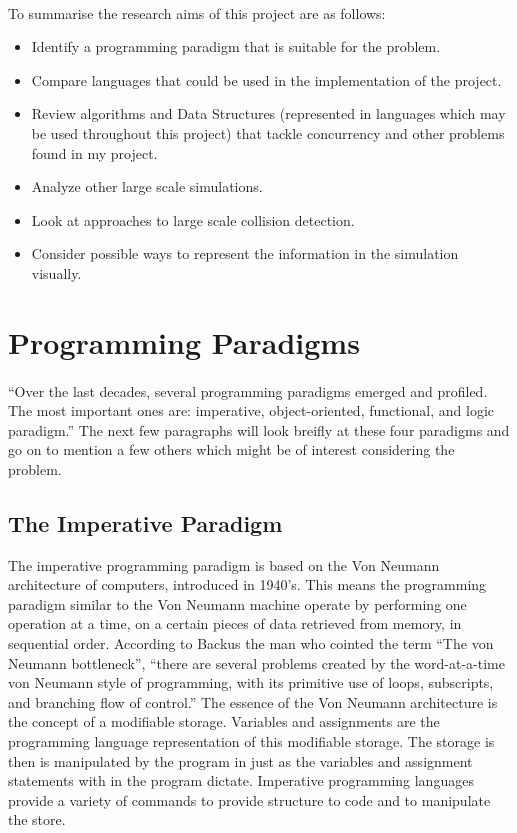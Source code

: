 \documentclass[main.tex]{subfiles}
\begin{document}
\paragraph{}To summarise the research aims of this project are as follows:
\begin{itemize}
	\item Identify a programming paradigm that is suitable for the problem.
	\item Compare languages that could be used in the implementation of the project.
	\item Review algorithms and Data Structures (represented in languages which may be used throughout this project) that tackle concurrency and other problems found in my project.
	\item Analyze other large scale simulations.
	\item Look at approaches to large scale collision detection.
	\item Consider possible ways to represent the information in the simulation visually.
\end{itemize}



\section{Programming Paradigms}
\paragraph{}``Over the last decades, several programming paradigms emerged and profiled. The most important ones are: imperative, object-oriented, functional, and logic paradigm.''\cite{Vujosevic2008} The next few paragraphs will look breifly at these four paradigms and go on to mention a few others which might be of interest considering the problem.

\subsection{The Imperative Paradigm}
The imperative programming paradigm is based on the Von Neumann architecture of computers, introduced in 1940’s. \cite{Vujosevic2008} This means the programming paradigm similar to the Von Neumann machine operate by performing one operation at a time, on a certain pieces of data retrieved from memory, in sequential order. According to Backus \cite{Backus1978} the man who cointed the term ``The von Neumann bottleneck'', ``there are several problems created by the word-at-a-time von Neumann style of programming, with its primitive use of loops, subscripts, and branching flow of control.'' The essence of the Von Neumann architecture is the concept of a modifiable storage. Variables and assignments are the programming language representation of this modifiable storage. The storage is then is manipulated by the program in just as the variables and assignment statements with in the program dictate. Imperative programming languages provide a variety of commands to provide structure to code and to manipulate the store.\cite{Aaby1996}
\end{document}

